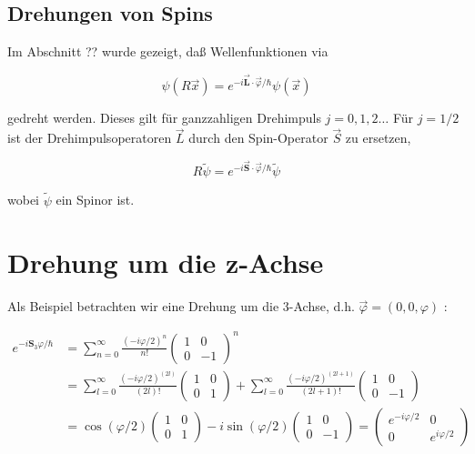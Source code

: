 \documentclass[10pt, letterpaper]{article}
\begin{document}
\subsection*{Drehungen von Spins}
Im Abschnitt ?? wurde gezeigt, daß Wellenfunktionen via

$$
\psi(R \vec{x})=e^{-i \overrightarrow{\mathbf{L}} \cdot \vec{\varphi} / \hbar} \psi(\vec{x})
$$

gedreht werden. Dieses gilt für ganzzahligen Drehimpuls $j=0,1,2 \ldots$ Für $j=1 / 2$ ist der Drehimpulsoperatoren $\vec{L}$ durch den Spin-Operator $\vec{S}$ zu ersetzen,

$$
R \tilde{\psi}=e^{-i \overrightarrow{\mathbf{S}} \cdot \vec{\varphi} / \hbar} \tilde{\psi}
$$

wobei $\tilde{\psi}$ ein Spinor ist.

\section*{Drehung um die z-Achse}
Als Beispiel betrachten wir eine Drehung um die 3-Achse, d.h. $\vec{\varphi}=(0,0, \varphi)$ :

$$
\begin{aligned}
e^{-i \mathbf{S}_{3} \varphi / \hbar} & =\sum_{n=0}^{\infty} \frac{(-i \varphi / 2)^{n}}{n!}\left(\begin{array}{cc}
1 & 0 \\
0 & -1
\end{array}\right)^{n} \\
& =\sum_{l=0}^{\infty} \frac{(-i \varphi / 2)^{(2 l)}}{(2 l)!}\left(\begin{array}{ll}
1 & 0 \\
0 & 1
\end{array}\right)+\sum_{l=0}^{\infty} \frac{(-i \varphi / 2)^{(2 l+1)}}{(2 l+1)!}\left(\begin{array}{cc}
1 & 0 \\
0 & -1
\end{array}\right) \\
& =\cos (\varphi / 2)\left(\begin{array}{ll}
1 & 0 \\
0 & 1
\end{array}\right)-i \sin (\varphi / 2)\left(\begin{array}{cc}
1 & 0 \\
0 & -1
\end{array}\right)=\left(\begin{array}{cc}
e^{-i \varphi / 2} & 0 \\
0 & e^{i \varphi / 2}
\end{array}\right)
\end{aligned}
$$
\end{document}

